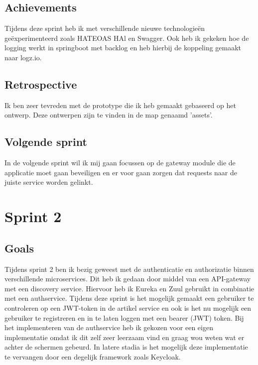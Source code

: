 \documentclass[11pt, twoside]{report}
\begin{document}
    \subsection{Achievements}\label{subsec:achievements-1}
    Tijdens deze sprint heb ik met verschillende nieuwe technologieën geëxperimenteerd zoals HATEOAS HAl en Swagger.
    Ook heb ik gekeken hoe de logging werkt in springboot met backlog en heb hierbij de koppeling gemaakt naar logz.io.

    \subsection{Retrospective}\label{subsec:retrospective-1}
    Ik ben zeer tevreden met de prototype die ik heb gemaakt gebaseerd op het ontwerp.
    Deze ontwerpen zijn te vinden in de map genaamd 'assets'.

    \subsection{Volgende sprint}\label{subsec:volgende-sprint-1}
    In de volgende sprint wil ik mij gaan focussen op de gateway module die de applicatie moet gaan beveiligen en er
    voor gaan zorgen dat requests naar de juiste service worden gelinkt.


    \newpage
    \section{Sprint 2}
    \label{sec:sprint-2}

    \subsection{Goals}\label{subsec:goals=2}
    Tijdens sprint 2 ben ik bezig geweest met de authenticatie en authorizatie binnen verschillende microservices.
    Dit heb ik gedaan door middel van een API-gateway met een discovery service.
    Hiervoor heb ik Eureka en Zuul gebruikt in combinatie met een authservice.
    Tijdens deze sprint is het mogelijk gemaakt een gebruiker te controleren op een JWT-token in de artikel service en
    ook is het nu mogelijk een gebruiker te registreren en in te laten loggen met een bearer (JWT) token.
    Bij het implementeren van de authservice heb ik gekozen voor een eigen implementatie omdat ik
    dit zelf
    zeer leerzaam vind en graag wou weten wat er achter de schermen gebeurd.
    In latere stadia is het mogelijk deze implementatie te vervangen door een degelijk framework zoals Keycloak.
\end{document}
